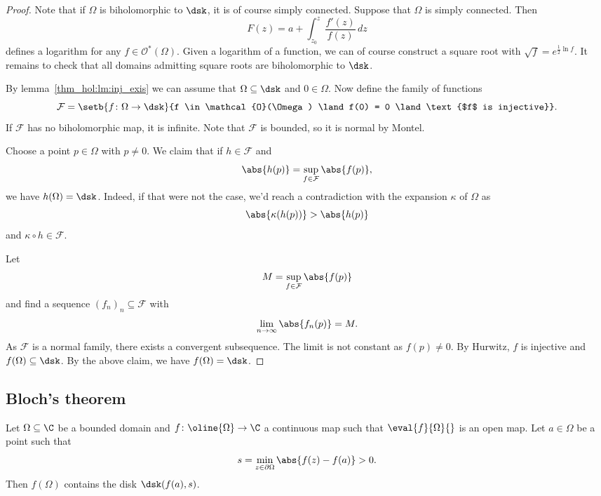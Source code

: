 \begin{proof}
Note that if $\Omega$ is biholomorphic to $\dsk$, it is of course
simply connected. Suppose that $\Omega$ is simply connected. Then
\[
F(z) = a + \int_{z_0}^z \frac{f'(z)}{f(z)}\,dz
\]
defines a logarithm for any $f \in \mathcal{O}^*(\Omega)$. Given a
logarithm of a function, we can of course construct a square root
with $\sqrt{f} = e^{\frac{1}{2} \ln f}$. It remains to check that
all domains admitting square roots are biholomorphic to $\dsk$.

By lemma~\ref{thm_hol:lm:inj_exis} we can assume that
$\Omega \subseteq \dsk$ and $0 \in \Omega$. Now define the family
of functions
\[
\mathcal{F} = \setb{f \colon \Omega \to \dsk}
{f \in \mathcal{O}(\Omega) \land
f(0) = 0 \land \text{$f$ is injective}}.
\]
If $\mathcal{F}$ has no biholomorphic map, it is infinite. Note
that $\mathcal{F}$ is bounded, so it is normal by Montel.

Choose a point $p \in \Omega$ with $p \ne 0$. We claim that if
$h \in \mathcal{F}$ and
\[
\abs{h(p)} = \sup_{f \in \mathcal{F}} \abs{f(p)},
\]
we have $h(\Omega) = \dsk$. Indeed, if that were not the case, we'd
reach a contradiction with the expansion $\kappa$ of $\Omega$ as
\[
\abs{\kappa(h(p))} > \abs{h(p)}
\]
and $\kappa \circ h \in \mathcal{F}$.

Let
\[
M = \sup_{f \in \mathcal{F}} \abs{f(p)}
\]
and find a sequence $(f_n)_n \subseteq \mathcal{F}$ with
\[
\lim_{n \to \infty} \abs{f_n(p)} = M.
\]
As $\mathcal{F}$ is a normal family, there exists a convergent
subsequence. The limit is not constant as $f(p) \ne 0$. By Hurwitz,
$f$ is injective and $f(\Omega) \subseteq \dsk$. By the above
claim, we have $f(\Omega) = \dsk$.
\end{proof}

\newpage

\subsection{Bloch's theorem}


\begin{lema}
Let $\Omega \subseteq \C$ be a bounded domain and
$f \colon \oline{\Omega} \to \C$ a continuous map such that
$\eval{f}{\Omega}{}$ is an open map. Let $a \in \Omega$ be a point
such that
\[
s = \min_{z \in \partial \Omega} \abs{f(z) - f(a)} > 0.
\]
Then $f(\Omega)$ contains the disk $\dsk(f(a), s)$.
\end{lema}

